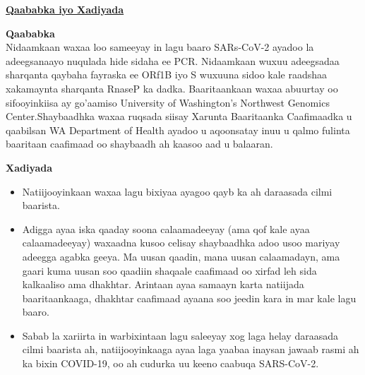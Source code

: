 \documentclass[10pt]{article}
\begin{document}
\bigskip

\large \underline{\textbf{Qaababka iyo Xadiyada}}

\textbf{Qaababka}\\
Nidaamkaan waxaa loo sameeyay in lagu baaro SARs-CoV-2 ayadoo la adeegsanaayo
nuqulada hide sidaha ee PCR. Nidaamkaan wuxuu adeegsadaa sharqanta qaybaha
fayraska ee ORf1B iyo S wuxuuna sidoo kale raadshaa xakamaynta sharqanta RnaseP
ka dadka. Baaritaankaan waxaa abuurtay oo sifooyinkiisa ay go'aamiso University
of Washington’s Northwest Genomics Center.Shaybaadhka waxaa ruqsada siisay
Xarunta Baaritaanka Caafimaadka u qaabilsan WA Department of Health ayadoo u
aqoonsatay inuu u qalmo fulinta baaritaan caafimaad oo shaybaadh ah kaasoo aad u
balaaran.

\textbf{Xadiyada}

\begin{itemize}

\item

  Natiijooyinkaan waxaa lagu bixiyaa ayagoo qayb ka ah daraasada cilmi baarista.

\item

  Adigga ayaa iska qaaday soona calaamadeeyay (ama qof kale ayaa calaamadeeyay)
  waxaadna kusoo celisay shaybaadhka adoo usoo mariyay adeegga agabka geeya. Ma
  uusan qaadin, mana uusan calaamadayn, ama gaari kuma uusan soo qaadiin
  shaqaale caafimaad oo xirfad leh sida kalkaaliso ama dhakhtar. Arintaan ayaa
  samaayn karta natiijada baaritaankaaga, dhakhtar caafimaad ayaana soo jeedin
  kara in mar kale lagu baaro.

\item

  Sabab la xariirta in warbixintaan lagu saleeyay xog laga helay daraasada cilmi
  baarista ah, natiijooyinkaaga ayaa laga yaabaa inaysan jawaab rasmi ah ka
  bixin COVID-19, oo ah cudurka uu keeno caabuqa SARS-CoV-2.

\end{itemize}
\end{document}
